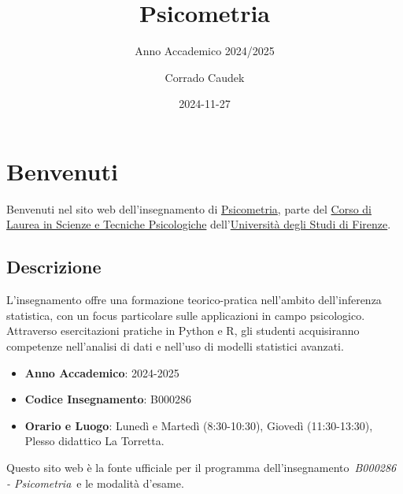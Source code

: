 \documentclass[
  letterpaper,
  DIV=11,
  numbers=noendperiod]{scrreprt}
\title{Psicometria}
\subtitle{Anno Accademico 2024/2025}
\author{Corrado Caudek}
\date{2024-11-27}
\providecommand{\tightlist}{%
  \setlength{\itemsep}{0pt}\setlength{\parskip}{0pt}}\usepackage{longtable,booktabs,array}
\renewcommand*\contentsname{Indice}
\newcommand\contentsname{Indice}
\theoremstyle{definition}
\theoremstyle{remark}
\begin{document}
\maketitle

\renewcommand*\contentsname{Indice}
{
\hypersetup{linkcolor=}
\setcounter{tocdepth}{4}
\tableofcontents
}


\chapter*{Benvenuti}\label{benvenuti}


Benvenuti nel sito web dell'insegnamento di
\href{https://www.unifi.it/index.php?module=ofform2&mode=1&cmd=3&AA=2023&afId=689762}{Psicometria},
parte del
\href{https://www.psicologia.unifi.it/vp-130-scienze-e-tecniche-psicologiche-l-24.html}{Corso
di Laurea in Scienze e Tecniche Psicologiche}
dell'\href{https://www.unifi.it/}{Università degli Studi di Firenze}.

\section*{Descrizione}\label{descrizione}


L'insegnamento offre una formazione teorico-pratica nell'ambito
dell'inferenza statistica, con un focus particolare sulle applicazioni
in campo psicologico. Attraverso esercitazioni pratiche in Python e R,
gli studenti acquisiranno competenze nell'analisi di dati e nell'uso di
modelli statistici avanzati.

\begin{itemize}
\tightlist
\item
  \textbf{Anno Accademico}: 2024-2025
\item
  \textbf{Codice Insegnamento}: B000286
\item
  \textbf{Orario e Luogo}: Lunedì e Martedì (8:30-10:30), Giovedì
  (11:30-13:30), Plesso didattico La Torretta.
\end{itemize}

\begin{tcolorbox}[enhanced jigsaw, leftrule=.75mm, title=\textcolor{quarto-callout-note-color}{\faInfo}\hspace{0.5em}{Nota}, colframe=quarto-callout-note-color-frame, colbacktitle=quarto-callout-note-color!10!white, arc=.35mm, toptitle=1mm, breakable, rightrule=.15mm, opacityback=0, bottomrule=.15mm, toprule=.15mm, bottomtitle=1mm, coltitle=black, titlerule=0mm, left=2mm, opacitybacktitle=0.6, colback=white]

Questo sito web è la fonte ufficiale per il programma
dell'insegnamento~\emph{B000286 - Psicometria}~e le modalità d'esame.

\end{tcolorbox}
\end{document}
